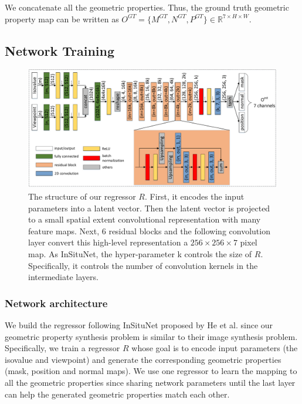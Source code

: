 \documentclass[journal]{vgtc}                %
\begin{document}
We concatenate all the geometric properties. Thus, the ground truth geometric property map can be written as $O^{GT} = \{M^{GT}, N^{GT}, P^{GT}\} \in \mathbb{R}^{7 \times H \times W}$. 

\subsection{Network Training}

\begin{figure}
  \centering
  \includegraphics[width=1\linewidth]{regressor}
  \caption{The structure of our regressor $R$. First, it encodes the input parameters into a latent vector. Then the latent vector is projected to a small spatial extent convolutional representation with many feature maps. Next, $6$ residual blocks and the following convolution layer convert this high-level representation a $256 \times 256 \times 7$ pixel map. As InSituNet, the hyper-parameter k controls the size of $R$. Specifically, it controls the number of convolution kernels in the intermediate layers.}
  \label{fig:regressor}
\end{figure}

\subsubsection{Network architecture}
We build the regressor following InSituNet proposed by He et al. \cite{he2019insitunet} since our geometric property synthesis problem is similar to their image synthesis problem. Specifically, we train a regressor $R$ whose goal is to encode input parameters (the isovalue and viewpoint) and generate the corresponding geometric properties (mask, position and normal maps). We use one regressor to learn the mapping to all the geometric properties since sharing network parameters until the last layer can help the generated geometric properties match each other.
\end{document}

